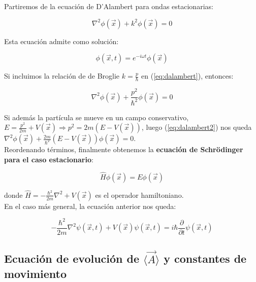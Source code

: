 \documentclass[a4paper]{article}
\begin{document}
Partiremos de la ecuaci\'on de D'Alambert para ondas estacionarias:

\begin{equation}
\label{eq:dalambert}
\nabla^{2}\phi(\vec{x}) + k^{2}\phi(\vec{x}) = 0
\end{equation}

Esta ecuaci\'on admite como soluci\'on:

\begin{equation}
\label{eq:dalambertsol}
\phi(\vec{x},t) = e^{-i\omega t}\phi(\vec{x})
\end{equation}

Si incluimos la relaci\'on de de Broglie $k = \frac{p}{\hbar}$ en (\ref{eq:dalambert}), entonces:

\begin{equation}
\label{eq:dalambert2}
\nabla^{2}\phi(\vec{x}) + \frac{p^{2}}{\hbar^{2}}\phi(\vec{x}) = 0
\end{equation}

Si adem\'as la part\'icula se mueve en un campo conservativo, $E = \frac{p^{2}}{2m} + V(\vec{x}) \Rightarrow p^{2} = 2m(E - V(\vec{x}))$, luego (\ref{eq:dalambert2}) nos queda $\nabla^{2}\phi(\vec{x}) + \frac{2m}{\hbar^{2}}(E - V(\vec{x}))\phi(\vec{x}) = 0$.\\

Reordenando t\'erminos, finalmente obtenemos la \textbf{ecuaci\'on de Schr\"odinger para el caso estacionario}:

\begin{equation}
\label{eq:schrodinger}
\hat{H}\phi(\vec{x}) = E\phi(\vec{x})
\end{equation}

donde $\hat{H} = -\frac{\hbar^{2}}{2m}\nabla^{2} + V(\vec{x})$ es el operador hamiltoniano.\\

En el caso m\'as general, la ecuaci\'on anterior nos queda:

\begin{equation}
\label{eq:schrodingert}
-\frac{\hbar^{2}}{2m}\nabla^{2}\psi(\vec{x},t) + V(\vec{x})\psi(\vec{x},t) = i\hbar \frac{\partial}{\partial t}\psi(\vec{x},t)
\end{equation}

\subsection{Ecuaci\'on de evoluci\'on de $\langle \vec{A} \rangle$ y constantes de movimiento}
\end{document}
